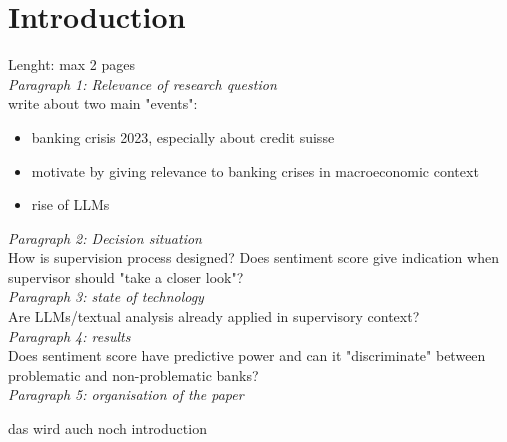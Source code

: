 \chapter{Introduction}\label{sec1}
\thispagestyle{empty}

Lenght: max 2 pages \\

\noindent
\textit{Paragraph 1: Relevance of research question} \\
\noindent
write about two main "events":

\begin{itemize}
	\item banking crisis 2023, especially about credit suisse
	\item motivate by giving relevance to banking crises in macroeconomic context
	\item rise of LLMs 
\end{itemize}

\noindent
\textit{Paragraph 2: Decision situation} \\
\noindent
How is supervision process designed? Does sentiment score give indication when supervisor should "take a closer look"? \\

\noindent
\textit{Paragraph 3: state of technology} \\
\noindent
Are LLMs/textual analysis already applied in supervisory context? \\

\noindent
\textit{Paragraph 4: results} \\
Does sentiment score have predictive power and can it "discriminate" between problematic and non-problematic banks? \\

\noindent
\textit{Paragraph 5: organisation of the paper}

\newpage

das wird auch noch introduction



\cleardoublepage
